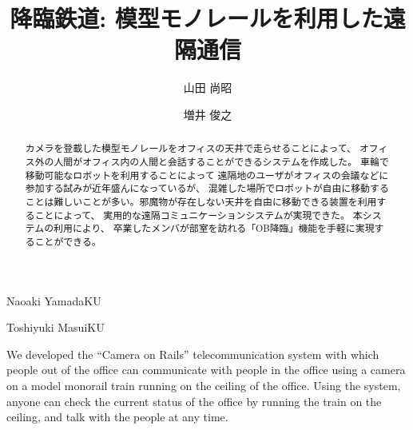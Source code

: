 \documentclass[submit,techreq]{ipsj}
\begin{document}
\title{降臨鉄道: 模型モノレールを利用した遠隔通信}


\author{山田 尚昭}{Naoaki Yamada}{KU}
\author{増井 俊之}{Toshiyuki Masui}{KU}

\begin{abstract}

カメラを登載した模型モノレールをオフィスの天井で走らせることによって、
オフィス外の人間がオフィス内の人間と会話することができるシステムを作成した。
車輪で移動可能なロボットを利用することによって
遠隔地のユーザがオフィスの会議などに参加する試みが近年盛んになっているが、
混雑した場所でロボットが自由に移動することは難しいことが多い。邪魔物が存在しない天井を自由に移動できる装置を利用することによって、
実用的な遠隔コミュニケーションシステムが実現できた。
本システムの利用により、
卒業したメンバが部室を訪れる「OB降臨」機能を手軽に実現することができる。
\end{abstract}

%
\begin{eabstract}
We developed the ``Camera on Rails'' telecommunication system with which
people out of the office can communicate with people in the office
using a camera on a model monorail train running on the ceiling of
the office. Using the system, anyone can check the current status of
the office by running the train on the ceiling, and talk with the
people at any time.
\end{eabstract}
%

\maketitle
\end{document}

